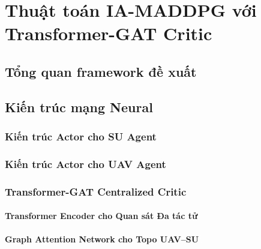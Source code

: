 \chapter{Thuật toán IA-MADDPG với Transformer-GAT Critic}
\label{chap:algorithm}

\section{Tổng quan framework đề xuất}
\label{sec:alg:overview}

\section{Kiến trúc mạng Neural}
\label{sec:alg:architecture}

\subsection{Kiến trúc Actor cho SU Agent}
\label{subsec:alg:actor:su}

\subsection{Kiến trúc Actor cho UAV Agent}
\label{subsec:alg:actor:uav}

\subsection{Transformer-GAT Centralized Critic}
\label{subsec:alg:critic:tgat}

\subsubsection{Transformer Encoder cho Quan sát Đa tác tử}
\label{subsubsec:alg:critic:transformer}

\subsubsection{Graph Attention Network cho Topo UAV--SU}
\label{subsubsec:alg:critic:gat}

